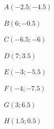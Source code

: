 \documentclass[a4paper,12pt]{scrartcl}
\begin{document}

\begin{multicols}{2}
$A(-2.5;-4.5)$

$B(6;-0.5)$

$C(-6.5;-6)$

$D(7;3.5)$

$E(-3;-5.5)$

$F(-4;-7.5)$

$G(3;6.5)$

$H(1.5;0.5)$
\end{multicols}
\end{document}
